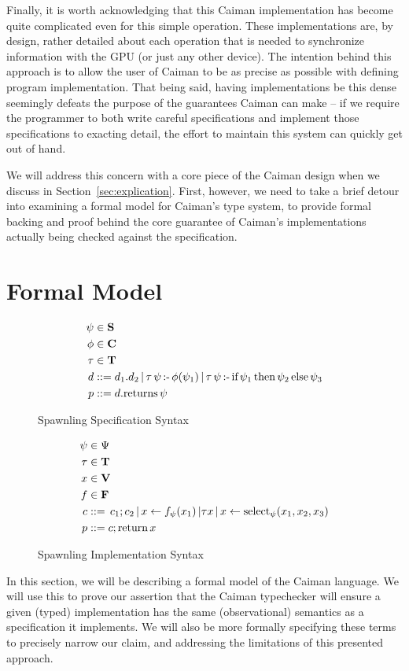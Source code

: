 Finally, it is worth acknowledging that this Caiman implementation has become quite complicated even for this simple operation.  These implementations are, by design, rather detailed about each operation that is needed to synchronize information with the GPU (or just any other device).  The intention behind this approach is to allow the user of Caiman to be as precise as possible with defining program implementation.  That being said, having implementations be this dense seemingly defeats the purpose of the guarantees Caiman can make -- if we require the programmer to both write careful specifications and implement those specifications to exacting detail, the effort to maintain this system can quickly get out of hand.

We will address this concern with a core piece of the Caiman design when we discuss in Section~\ref{sec:explication}.  First, however, we need to take a brief detour into examining a formal model for Caiman's type system, to provide formal backing and proof behind the core guarantee of Caiman's implementations actually being checked against the specification.

\section{Formal Model}
\label{sec:formal}

\begin{figure}
\begin{align*}
	\psi &\in \textbf{S}\\
	\phi &\in \textbf{C}\\
	\tau &\in \textbf{T} \\
    d &\mathrel{::=} d_1.d_2 \,|\,
        \tau\,\psi\,\textrm{:-}\, \phi(\psi_1) \,|\,
        \tau\,\psi\,\textrm{:-}\, \textrm{if}\, \psi_1 \,\textrm{then}\, \psi_2 \,\textrm{else}\, \psi_3 
        \\
    p &\mathrel{::=} d.\textrm{returns}\, \psi
\end{align*}
\caption{Spawnling Specification Syntax}
\label{fig:spawnspecsyntax}
\end{figure}

\begin{figure}
\begin{align*}
	\psi&\in \Psi\\
   	\tau&\in \textbf{T} \\
	x&\in \textbf{V}\\
	f&\in \textbf{F}\\
	c&\mathrel{::=} \,c_1 ; c_2 \,|\, 
        x\leftarrow f_\psi(x_1) \,| \tau x \,|\, x\leftarrow\textrm{select}_{\psi} (x_1, x_2, x_3)\\
    p&\mathrel{::=} c;\textrm{return}\, x
\end{align*}
\caption{Spawnling Implementation Syntax}
\label{fig:spawnimplsyntax}
\end{figure}
In this section, we will be describing a formal model of the Caiman language. We will use this to prove our assertion that the Caiman typechecker will ensure a given (typed) implementation has the same (observational) semantics as a specification it implements.  We will also be more formally specifying these terms to precisely narrow our claim, and addressing the limitations of this presented approach.

